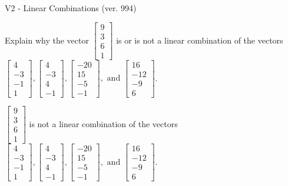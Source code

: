 \begin{exercise}
  \begin{exerciseTitle}V2 - Linear Combinations (ver. 994)\end{exerciseTitle}
  \begin{exerciseStatement}
    Explain why the vector \(\left[\begin{array}{c}
9 \\
3 \\
6 \\
1
\end{array}\right]\)  is or is not a linear 
	combination of the vectors \(\left[\begin{array}{c}
4 \\
-3 \\
-1 \\
1
\end{array}\right] , \left[\begin{array}{c}
4 \\
-3 \\
4 \\
-1
\end{array}\right] , \left[\begin{array}{c}
-20 \\
15 \\
-5 \\
-1
\end{array}\right] , \text{ and } \left[\begin{array}{c}
16 \\
-12 \\
-9 \\
6
\end{array}\right]\).
	


  \end{exerciseStatement}
  \begin{exerciseAnswer}
   \(\left[\begin{array}{c}
9 \\
3 \\
6 \\
1
\end{array}\right]\) 
  	 is not  
	a linear combination of the vectors \(\left[\begin{array}{c}
4 \\
-3 \\
-1 \\
1
\end{array}\right] , \left[\begin{array}{c}
4 \\
-3 \\
4 \\
-1
\end{array}\right] , \left[\begin{array}{c}
-20 \\
15 \\
-5 \\
-1
\end{array}\right] , \text{ and } \left[\begin{array}{c}
16 \\
-12 \\
-9 \\
6
\end{array}\right]\).


\end{exerciseAnswer}
\end{exercise}
